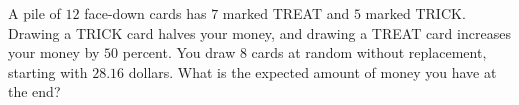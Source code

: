 A pile of $12$ face-down cards has $7$ marked TREAT and $5$ marked TRICK. Drawing a TRICK card halves your money, and drawing a TREAT card increases your money by $50$ percent. You draw $8$ cards at random without replacement, starting with $28.16$ dollars. What is the expected amount of money you have at the end?
